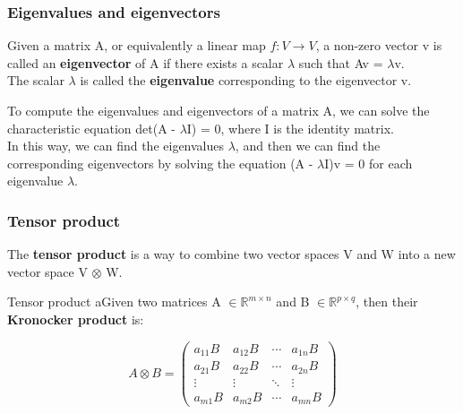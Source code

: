 \subsubsection {Eigenvalues and eigenvectors}
Given a matrix A, or equivalently a linear map $f: V \rightarrow V$, a non-zero vector v is called an \textbf{eigenvector} of A if there exists a scalar $\lambda$ such that Av = $\lambda$v.\\
The scalar $\lambda$ is called the \textbf{eigenvalue} corresponding to the eigenvector v.
\medskip

\noindent
To compute the eigenvalues and eigenvectors of a matrix A, we can solve the characteristic equation det(A - $\lambda$I) = 0, where I is the identity matrix.\\
In this way, we can find the eigenvalues $\lambda$, and then we can find the corresponding eigenvectors by solving the equation (A - $\lambda$I)v = 0 for each eigenvalue $\lambda$.


\subsubsection{Tensor product}
The \textbf{tensor product} is a way to combine two vector spaces V and W into a new vector space V $\otimes$ W.

\begin{defBox}{Tensor product}
    aGiven two matrices A $\in \mathbb{R}^{m \times n}$ and B $\in \mathbb{R}^{p \times q}$, then their \textbf{Kronocker product} is:
    \begin{center}
        \[
        A \otimes B =
        \begin{pmatrix}
        a_{11}B & a_{12}B & \cdots & a_{1n}B \\
        a_{21}B & a_{22}B & \cdots & a_{2n}B \\
        \vdots & \vdots & \ddots & \vdots \\
        a_{m1}B & a_{m2}B & \cdots & a_{mn}B
        \end{pmatrix}
        \]
    \end{center}
    
\end{defBox}